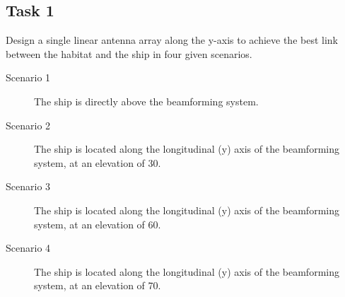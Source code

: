 \documentclass{article}
\begin{document}
\subsection*{Task 1}

Design a single linear antenna array along the y-axis to achieve the best link 
between the habitat and the ship in four given scenarios.
\begin{description}
	\item[Scenario 1] The ship is directly above the beamforming system.
	\item[Scenario 2] The ship is located along the longitudinal (y) axis of 
	the beamforming system, at an elevation of 30\textdegree.
	\item[Scenario 3] The ship is located along the longitudinal (y) axis of 
	the beamforming system, at an elevation of 60\textdegree.
	\item[Scenario 4] The ship is located along the longitudinal (y) axis of 
	the beamforming system, at an elevation of 70\textdegree.
\end{description}
\end{document}
